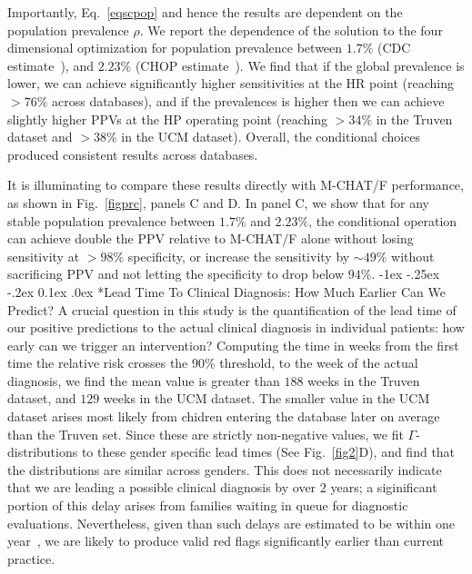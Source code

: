 \documentclass[onecolumn,,10pt]{IEEEtran}
\makeatletter
\renewcommand\subsection{\@startsection {section}{1}{\z@}%
  {-1ex \@plus -.25ex \@minus -.2ex}%
  {0.1ex \@plus.0ex}%
  {\fontsize{11}{12}\selectfont\bfseries\sffamily\color{DodgerBlue4}}}
\makeatother
\begin{document}
Importantly, Eq.~\eqref{eqscpop} and hence the results are dependent on the population prevalence $\rho$. We report the dependence of the solution to the four dimensional optimization for population prevalence between $1.7\%$ (CDC estimate~\cite{hyman2020identification}), and $2.23\%$ (CHOP estimate~\cite{pmid31562252}). We find that if the global prevalence is lower, we can achieve significantly higher sensitivities at the HR point (reaching $>76\%$ across databases), and if the prevalences is higher then we can achieve slightly higher PPVs at the HP operating point (reaching $>34\%$ in the Truven dataset and $>38\%$ in the UCM dataset).
Overall, the conditional choices produced consistent results across databases.

It is illuminating to compare these results directly with M-CHAT/F performance, as shown in Fig.~\ref{figprc}, panels C and D. In panel C, we show that for any stable population prevalence between 
$1.7\%$ and $2.23\%$, the conditional operation can achieve  double the PPV relative to M-CHAT/F alone without losing sensitivity at $>98\%$ specificity, or increase the sensitivity by $\sim 49\%$ without sacrificing PPV and   not letting the  specificity to drop below $94\%$.
%
\subsection*{Lead Time  To Clinical Diagnosis: How Much Earlier Can We Predict?}
A  crucial question in this study is the quantification of  the lead time  of our positive predictions   to the actual clinical diagnosis in individual patients: how early can we trigger an intervention? Computing the time in weeks from the first time the relative risk crosses the $90\%$ threshold, to the week of the actual diagnosis, we find the mean value is greater than $188$ weeks in the Truven dataset, and $129$ weeks in the UCM dataset. The smaller value in the UCM dataset arises most likely from  chidren entering the database later on average than the Truven set.  Since these are strictly non-negative values, we fit $\Gamma$-distributions to these gender specific lead times (See Fig.~\ref{fig2}D), and find that the distributions are  similar across genders. This does not necessarily indicate that we are   leading a possible clinical diagnosis by over $2$ years; a siginificant portion of this delay arises from families waiting in queue for diagnostic evaluations. Nevertheless, given than such delays are estimated to be within  one year~\cite{gordon2016whittling},  we are likely to produce valid red flags significantly earlier than current practice.
\end{document}
